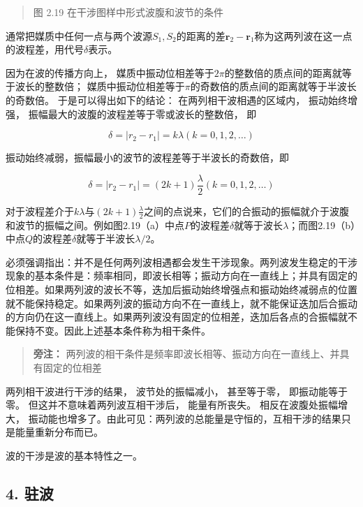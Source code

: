 \begin{quote}
图 2.19 在干涉图样中形式波腹和波节的条件
\end{quote}

通常把媒质中任何一点与两个波源\(S_{1}, S_{2}\)的距离的差\(\pmb{r}_{2} - \pmb{r}_{1}\)称为这两列波在这一点的波程差，用代号\(\delta\)表示。

因为在波的传播方向上，
媒质中振动位相差等于\(2\pi\)的整数倍的质点间的距离就等于波长的整数倍；
媒质中振动位相差等于\(\pi\)的奇数倍的质点间的距离就等于半波长的奇数倍。
于是可以得出如下的结论： 在两列相干波相遇的区域内， 振动始终增强，
振幅最大的波腹的波程差等于零或波长的整数倍， 即

\[
\delta = \left| r _ {2} - r _ {1} \right| = k \lambda (k = 0, 1, 2, \dots)
\]

振动始终减弱，振幅最小的波节的波程差等于半波长的奇数倍，即

\[
\delta = \left| r _ {2} - r _ {1} \right| = (2 k + 1) \frac {\lambda}{2} (k = 0, 1, 2, \dots)
\]

对于波程差介于\(k\lambda\)与\((2k + 1)\frac{\lambda}{2}\)之间的点说来，它们的合振动的振幅就介于波腹和波节的振幅之间。例如图2.19（a）中点\(P\)的波程差\(\delta\)就等于波长\(\lambda\)；而图2.19（b）中点\(Q\)的波程差\(\delta\)就等于半波长\(\lambda / 2\)。

必须强调指出：并不是任何两列波相遇都会发生干涉现象。两列波发生稳定的干涉现象的基本条件是：频率相同，即波长相等；振动方向在一直线上；并具有固定的位相差。如果两列波的波长不等，迭加后振动始终增强点和振动始终减弱点的位置就不能保持稳定。如果两列波的振动方向不在一直线上，就不能保证迭加后合振动的方向仍在这一直线上。如果两列波没有固定的位相差，迭加后各点的合振幅就不能保持不变。因此上述基本条件称为相干条件。

\begin{quote}
\textbf{旁注：}
两列波的相干条件是频率即波长相等、振动方向在一直线上、并具有固定的位相差
\end{quote}

两列相干波进行干涉的结果， 波节处的振幅减小， 甚至等于零，
即振动能等于零。 但这并不意味着两列波互相干涉后， 能量有所丧失。
相反在波腹处振幅增大，
振动能也增多了。由此可见：两列波的总能量是守恒的，互相干涉的结果只是能量重新分布而已。

波的干涉是波的基本特性之一。

\subsection{4. 驻波}\label{ux9a7bux6ce2}

